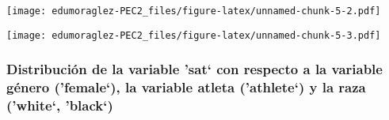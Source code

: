 \documentclass[
]{article}
\newenvironment{Shaded}{\begin{snugshade}}{\end{snugshade}}
\newcommand{\AttributeTok}[1]{\textcolor[rgb]{0.80,0.80,0.80}{#1}}
\newcommand{\CommentTok}[1]{\textcolor[rgb]{0.50,0.62,0.50}{#1}}
\newcommand{\ConstantTok}[1]{\textcolor[rgb]{0.86,0.64,0.64}{\textbf{#1}}}
\newcommand{\DecValTok}[1]{\textcolor[rgb]{0.86,0.86,0.80}{#1}}
\newcommand{\FunctionTok}[1]{\textcolor[rgb]{0.94,0.94,0.56}{#1}}
\newcommand{\NormalTok}[1]{\textcolor[rgb]{0.80,0.80,0.80}{#1}}
\newcommand{\SpecialCharTok}[1]{\textcolor[rgb]{0.86,0.64,0.64}{#1}}
\newcommand{\StringTok}[1]{\textcolor[rgb]{0.80,0.58,0.58}{#1}}
\begin{document}
\texttt{[image: edumoraglez-PEC2\_files/figure-latex/unnamed-chunk-5-2.pdf]}

\begin{Shaded}
\end{Shaded}

\texttt{[image: edumoraglez-PEC2\_files/figure-latex/unnamed-chunk-5-3.pdf]}

\hypertarget{distribuciuxf3n-de-la-variable-sat-con-respecto-a-la-variable-guxe9nero-female-la-variable-atleta-athlete-y-la-raza-white-black}{%
\subsubsection{Distribución de la variable 'sat` con respecto a la
variable género ('female`), la variable atleta ('athlete`) y la raza
('white`,
'black`)}\label{distribuciuxf3n-de-la-variable-sat-con-respecto-a-la-variable-guxe9nero-female-la-variable-atleta-athlete-y-la-raza-white-black}}
\end{document}
